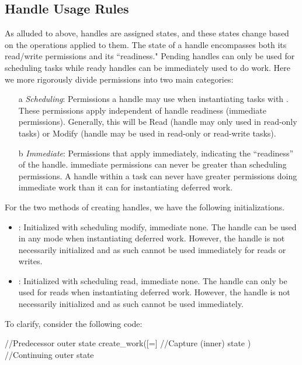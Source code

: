 \subsection{Handle Usage Rules}
\label{sec:handlerules}
As alluded to above, \glspl{handle} are assigned states, and these states change 
based on the operations applied to them.  
The state of a \gls{handle} encompasses both its read/write permissions and its ``readiness."
Pending \glspl{handle} can only be used for scheduling \glspl{task} while
ready \glspl{handle} can be immediately used to do work.
Here we more rigorously divide permissions into two main categories: 
\begin{itemize}
  \item[a] {\it Scheduling}: Permissions a \gls{handle} may use when instantiating
  tasks with .
  These permissions apply independent of \gls{handle} readiness (\gls{immediate
  permissions}).  Generally, this will be Read (\gls{handle} may only used in read-only
\glspl{task}) or Modify (\gls{handle} may be used in read-only or read-write
\glspl{task}). 
\item[b] {\it Immediate}: Permissions that apply immediately, indicating the
  ``readiness'' of the \gls{handle}.  \Gls{immediate permissions} can never be
  greater than \gls{scheduling permissions}.
  A handle within a \gls{task} can never have greater permissions doing immediate work than it can for instantiating deferred work.
\end{itemize}

For the two methods of creating \glspl{handle}, we have the following initializations.
\begin{itemize}
\item {}: Initialized with scheduling modify, immediate none. 
  The \gls{handle} can be used in any mode when instantiating \gls{deferred work}.
  However, the \gls{handle} is not necessarily initialized and as such cannot be used immediately for reads or writes.
%
\item {}: Initialized with scheduling read, immediate none.
  The \gls{handle} can only be used for reads when instantiating \gls{deferred work}.
  However, the \gls{handle} is not necessarily initialized and as such cannot be used immediately.
\end{itemize}

To clarify, consider the following code:
\begin{CppCode}
//Predecessor outer state
create_work([=]{
  //Capture (inner) state
})
//Continuing outer state
\end{CppCode}

